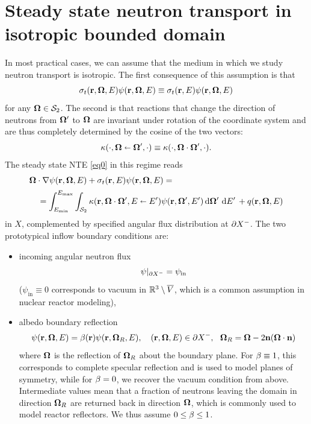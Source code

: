 \section{Steady state neutron transport in isotropic bounded domain}\label{sec:NTE}
In most practical cases, we can assume that the medium in which we study neutron transport is isotropic.
The first consequence of this assumption is that 
$$
	\sigma_t(\br,\bomega,E)\psi(\br,\bomega,E) \equiv \sigma_t(\br,E)\psi(\br,\bomega,E)
$$ 
for any $\bomega\in\Sphere$. The
second is that reactions that change the direction of neutrons from $\bomega'$ to $\bomega$ are
invariant under rotation of the coordinate system and are thus completely determined by the cosine of the two vectors:
\begin{equation}\label{eq:iso}
	\kappa(\cdot,\bomega\sla\bomega',\cdot) \equiv \kappa(\cdot,\bomega\cdot\bomega',\cdot).
\end{equation}
The steady state NTE \eqref{eq0} in this regime reads
\begin{equation}\label{eq1}
\begin{multlined}
  \bomega\cdot\nabla\psi(\br,\bomega,E) + \sigma_t(\br,E)\psi(\br,\bomega,E) =\\[.25em]
   = \intE[']{\Emin}{\Emax}{
      \intA[']{\kappa(\br,\bomega\cdot\bomega',E\sla E')\psi(\br,\bomega',E')}
    } + q(\br,\bomega,E)
 \end{multlined}
\end{equation}
in $X$, complemented by specified angular flux distribution at $\pX[-]$. The two prototypical inflow boundary
conditions are:
\begin{itemize}
	\item incoming angular neutron flux
	\begin{equation}\label{eq:nte2}
	  \psi\vert_{\pX[-]} = \psi_{\text{in}}
	\end{equation}
	($\psi_{\text{in}}\equiv 0$ corresponds to vacuum in $\R[3]\setminus \overline V$, which is a common
	 assumption in nuclear reactor modeling),
	
	\item albedo boundary reflection
	\begin{equation}\label{eq:nte3}
  	\psi(\br,\bomega,E) = \albedo(\br)\psi(\br, \bomega_R, E),\quad (\br,\bomega,E)\in \pX[-],\ \ \bomega_R = \bomega - 2
  	\bn (\bomega \cdot \bn)
  \end{equation}
  where $\bomega$ is the reflection of $\bomega_R$ about the boundary plane. For $\albedo \equiv 1$, this corresponds to
  complete specular reflection and is used to model planes of symmetry, while for $\albedo =
  0$, we recover the vacuum condition from above. Intermediate values mean that a fraction of neutrons leaving the
  domain in direction $\bomega_R$ are returned back in direction $\bomega$, which is commonly used to model reactor
  reflectors. We thus assume $0 \leq \albedo \leq 1$. 
\end{itemize}
